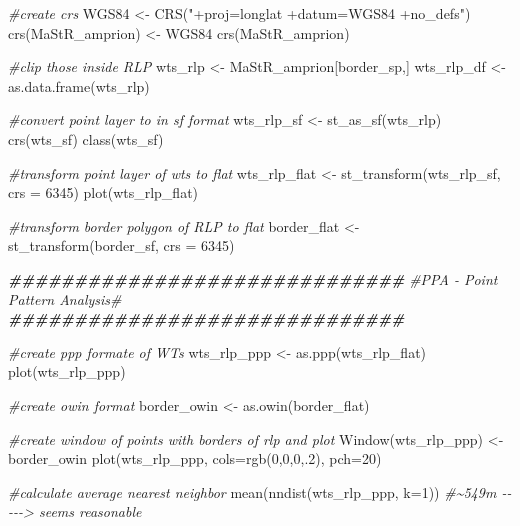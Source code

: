 \documentclass[a4paper,11pt]{article}
\newenvironment{Shaded}{\begin{snugshade}}{\end{snugshade}}
\newcommand{\AttributeTok}[1]{\textcolor[rgb]{0.77,0.63,0.00}{#1}}
\newcommand{\CommentTok}[1]{\textcolor[rgb]{0.56,0.35,0.01}{\textit{#1}}}
\newcommand{\DecValTok}[1]{\textcolor[rgb]{0.00,0.00,0.81}{#1}}
\newcommand{\DocumentationTok}[1]{\textcolor[rgb]{0.56,0.35,0.01}{\textbf{\textit{#1}}}}
\newcommand{\FunctionTok}[1]{\textcolor[rgb]{0.00,0.00,0.00}{#1}}
\newcommand{\NormalTok}[1]{#1}
\newcommand{\OtherTok}[1]{\textcolor[rgb]{0.56,0.35,0.01}{#1}}
\newcommand{\StringTok}[1]{\textcolor[rgb]{0.31,0.60,0.02}{#1}}
\begin{document}
\begin{Shaded}
\begin{Highlighting}[]
\CommentTok{\#create crs}
\NormalTok{WGS84 }\OtherTok{\textless{}{-}} \FunctionTok{CRS}\NormalTok{(}\StringTok{"+proj=longlat +datum=WGS84 +no\_defs"}\NormalTok{)}
\FunctionTok{crs}\NormalTok{(MaStR\_amprion) }\OtherTok{\textless{}{-}}\NormalTok{ WGS84}
\FunctionTok{crs}\NormalTok{(MaStR\_amprion)}

\CommentTok{\#clip those inside RLP }
\NormalTok{wts\_rlp }\OtherTok{\textless{}{-}}\NormalTok{ MaStR\_amprion[border\_sp,]}
\NormalTok{wts\_rlp\_df }\OtherTok{\textless{}{-}} \FunctionTok{as.data.frame}\NormalTok{(wts\_rlp)}


\CommentTok{\#convert point layer to in sf format}
\NormalTok{wts\_rlp\_sf }\OtherTok{\textless{}{-}} \FunctionTok{st\_as\_sf}\NormalTok{(wts\_rlp)}
\FunctionTok{crs}\NormalTok{(wts\_sf)}
\FunctionTok{class}\NormalTok{(wts\_sf)}

\CommentTok{\#transform point layer of wts to flat}
\NormalTok{wts\_rlp\_flat }\OtherTok{\textless{}{-}} \FunctionTok{st\_transform}\NormalTok{(wts\_rlp\_sf, }\AttributeTok{crs =} \DecValTok{6345}\NormalTok{)}
\FunctionTok{plot}\NormalTok{(wts\_rlp\_flat)}

\CommentTok{\#transform border polygon of RLP to flat}
\NormalTok{border\_flat }\OtherTok{\textless{}{-}} \FunctionTok{st\_transform}\NormalTok{(border\_sf, }\AttributeTok{crs =} \DecValTok{6345}\NormalTok{)}

\DocumentationTok{\#\#\#\#\#\#\#\#\#\#\#\#\#\#\#\#\#\#\#\#\#\#\#\#\#\#\#\#\#\#}
\CommentTok{\#PPA {-} Point Pattern Analysis\#}
\DocumentationTok{\#\#\#\#\#\#\#\#\#\#\#\#\#\#\#\#\#\#\#\#\#\#\#\#\#\#\#\#\#\#}

\CommentTok{\#create ppp formate of WT\textquotesingle{}s}
\NormalTok{wts\_rlp\_ppp  }\OtherTok{\textless{}{-}} \FunctionTok{as.ppp}\NormalTok{(wts\_rlp\_flat)}
\FunctionTok{plot}\NormalTok{(wts\_rlp\_ppp)}

\CommentTok{\#create owin format}
\NormalTok{border\_owin }\OtherTok{\textless{}{-}} \FunctionTok{as.owin}\NormalTok{(border\_flat)}

\CommentTok{\#create window of points with borders of rlp and plot}
\FunctionTok{Window}\NormalTok{(wts\_rlp\_ppp) }\OtherTok{\textless{}{-}}\NormalTok{ border\_owin}
\FunctionTok{plot}\NormalTok{(wts\_rlp\_ppp, }\AttributeTok{cols=}\FunctionTok{rgb}\NormalTok{(}\DecValTok{0}\NormalTok{,}\DecValTok{0}\NormalTok{,}\DecValTok{0}\NormalTok{,.}\DecValTok{2}\NormalTok{), }\AttributeTok{pch=}\DecValTok{20}\NormalTok{)}

\CommentTok{\#calculate average nearest neighbor }
\FunctionTok{mean}\NormalTok{(}\FunctionTok{nndist}\NormalTok{(wts\_rlp\_ppp, }\AttributeTok{k=}\DecValTok{1}\NormalTok{))}
\CommentTok{\#\textasciitilde{}549m {-}{-}{-}{-}{-}\textgreater{} seems reasonable}


\end{Highlighting}
\end{Shaded}
\end{document}
